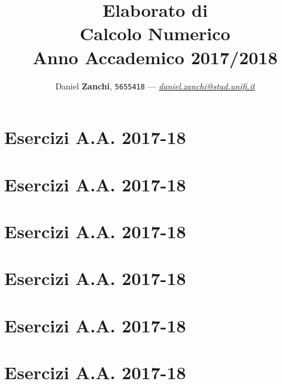 \documentclass[12pt,a4paper]{book}
\begin{document}
\title{\vspace{2cm}Elaborato di\\ \textbf{Calcolo Numerico}\\ Anno Accademico 2017/2018\vspace{3cm}}

\author{
	Daniel \textbf{Zanchi}, \texttt{5655418} --- \href{mailto:daniel,zanchi@stud.unifi.it}{\textit{daniel.zanchi@stud.unifi.it}}
}
\date{}
\maketitle

\chapter{Esercizi A.A. 2017-18}

\chapter{Esercizi A.A. 2017-18}

\chapter{Esercizi A.A. 2017-18}

\chapter{Esercizi A.A. 2017-18}

\chapter{Esercizi A.A. 2017-18}

\chapter{Esercizi A.A. 2017-18}

\end{document}
